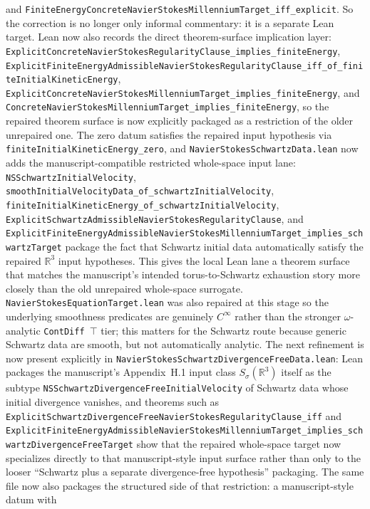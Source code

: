 \documentclass[11pt]{article}
\begin{document}
and \texttt{FiniteEnergyConcreteNavierStokesMillenniumTarget\_iff\_explicit}.
So the correction is no longer only informal commentary: it is a separate Lean
target.  Lean now also records the direct theorem-surface implication layer:
\texttt{ExplicitConcreteNavierStokesRegularityClause\_implies\_finiteEnergy},
\texttt{ExplicitFiniteEnergyAdmissibleNavierStokesRegularityClause\_iff\_of\_finiteInitialKineticEnergy},
\texttt{ExplicitConcreteNavierStokesMillenniumTarget\_implies\_finiteEnergy},
and \texttt{ConcreteNavierStokesMillenniumTarget\_implies\_finiteEnergy}, so
the repaired theorem surface is now explicitly packaged as a restriction of the
older unrepaired one.  The zero datum satisfies the repaired input hypothesis via
\texttt{finiteInitialKineticEnergy\_zero}, and
\texttt{NavierStokesSchwartzData.lean} now adds the manuscript-compatible
restricted whole-space input lane:
\texttt{NSSchwartzInitialVelocity},
\texttt{smoothInitialVelocityData\_of\_schwartzInitialVelocity},
\texttt{finiteInitialKineticEnergy\_of\_schwartzInitialVelocity},
\texttt{ExplicitSchwartzAdmissibleNavierStokesRegularityClause}, and
\texttt{ExplicitFiniteEnergyAdmissibleNavierStokesMillenniumTarget\_implies\_schwartzTarget}
package the fact that Schwartz initial data automatically satisfy the repaired
\(\mathbb{R}^3\) input hypotheses.  This gives the local Lean lane a theorem
surface that matches the manuscript's intended torus-to-Schwartz exhaustion
story more closely than the old unrepaired whole-space surrogate.
\texttt{NavierStokesEquationTarget.lean} was also repaired at this stage so the
underlying smoothness predicates are genuinely \(C^\infty\) rather than the
stronger \(\omega\)-analytic \texttt{ContDiff~$\top$} tier; this matters for the
Schwartz route because generic Schwartz data are smooth, but not automatically
analytic.  The next refinement is now present explicitly in
\texttt{NavierStokesSchwartzDivergenceFreeData.lean}: Lean packages the
manuscript's Appendix~H.1 input class \(S_\sigma(\mathbb{R}^3)\) itself as the
subtype \texttt{NSSchwartzDivergenceFreeInitialVelocity} of Schwartz data whose
initial divergence vanishes, and theorems such as
\texttt{ExplicitSchwartzDivergenceFreeNavierStokesRegularityClause\_iff} and
\texttt{ExplicitFiniteEnergyAdmissibleNavierStokesMillenniumTarget\_implies\_schwartzDivergenceFreeTarget}
show that the repaired whole-space target now specializes directly to that
manuscript-style input surface rather than only to the looser ``Schwartz plus a
separate divergence-free hypothesis'' packaging.  The same file now also
packages the structured side of that restriction: a manuscript-style datum with
\end{document}
